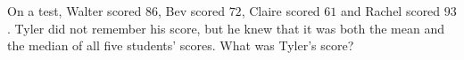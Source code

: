 On a test, Walter scored $86$, Bev scored $72$, Claire scored $61$ and Rachel scored $93$. Tyler did not remember his score, but he knew that it was both the mean and the median of all five students' scores. What was Tyler's score?
